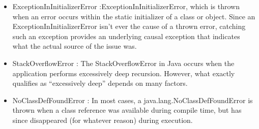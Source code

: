 \documentclass{article}
\begin{document}
\begin{itemize}
\item ExceptionInInitializerError :ExceptionInInitializerError, which is thrown when an error occurs within the static initializer of a class or object. Since an ExceptionInInitializerError isn’t ever the cause of a thrown error, catching such an exception provides an underlying causal exception that indicates what the actual source of the issue was.


\item StackOverflowError : The StackOverflowError in Java occurs when the application performs excessively deep recursion. However, what exactly qualifies as “excessively deep” depends on many factors.

\item NoClassDefFoundError : In most cases, a java.lang.NoClassDefFoundError is thrown when a class reference was available during compile time, but has since disappeared (for whatever reason) during execution.

\end{itemize}
\end{document}
